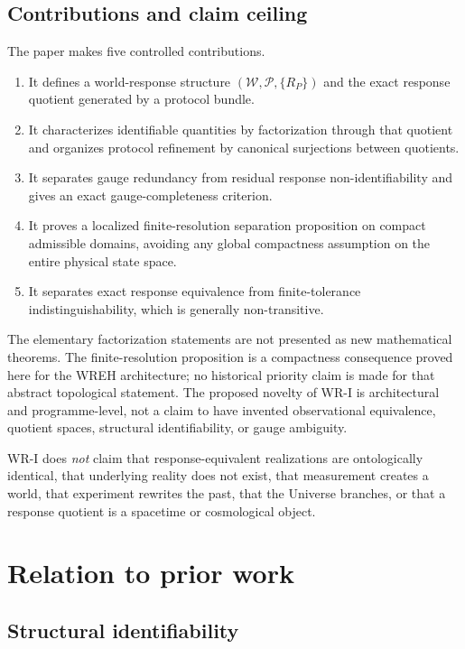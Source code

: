 \documentclass[11pt]{article}
\newcommand{\W}{\mathcal W}
\newcommand{\Pcal}{\mathcal P}
\begin{document}
\subsection*{Contributions and claim ceiling}

The paper makes five controlled contributions.
\begin{enumerate}[label=(\roman*)]
\item It defines a world-response structure $(\W,\Pcal,\{R_P\})$ and the exact
response quotient generated by a protocol bundle.
\item It characterizes identifiable quantities by factorization through that
quotient and organizes protocol refinement by canonical surjections between
quotients.
\item It separates gauge redundancy from residual response
non-identifiability and gives an exact gauge-completeness criterion.
\item It proves a localized finite-resolution separation proposition on
compact admissible domains, avoiding any global compactness assumption on the
entire physical state space.
\item It separates exact response equivalence from finite-tolerance
indistinguishability, which is generally non-transitive.
\end{enumerate}

The elementary factorization statements are not presented as new mathematical
theorems. The finite-resolution proposition is a compactness consequence
proved here for the WREH architecture; no historical priority claim is made for
that abstract topological statement. The proposed novelty of WR-I is
architectural and programme-level, not a claim to have invented observational
equivalence, quotient spaces, structural identifiability, or gauge ambiguity.

WR-I does \emph{not} claim that response-equivalent realizations are
ontologically identical, that underlying reality does not exist, that
measurement creates a world, that experiment rewrites the past, that the
Universe branches, or that a response quotient is a spacetime or cosmological
object.

\section{Relation to prior work}

\subsection{Structural identifiability}
\end{document}
